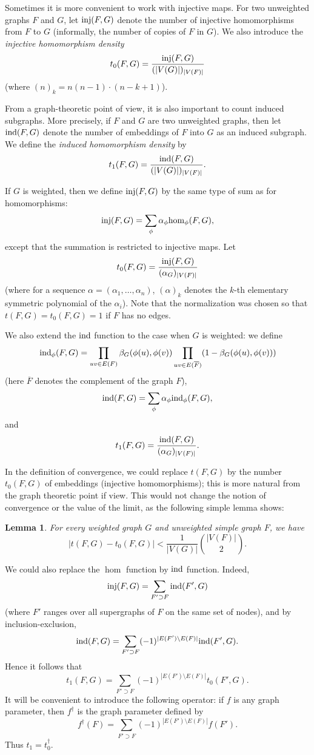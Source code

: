 \documentclass[fleqn]{article}
\newtheorem{lemma}[theorem]{Lemma}
\begin{document}
Sometimes it is more convenient to work with injective maps. For two
unweighted graphs $F$ and $G$, let ${\rm inj}(F,G)$ denote the number of
injective homomorphisms from $F$ to $G$ (informally, the number of
copies of $F$ in $G$). We also introduce the {\it injective
homomorphism density}
\[
t_0(F,G)=\frac{{\rm inj}(F,G)}{(|V(G)|)_{|V(F)|}}
\]
(where $(n)_k=n(n-1)\cdot(n-k+1)$).

From a graph-theoretic point of view, it is also important to count
induced subgraphs. More precisely, if $F$ and $G$ are two unweighted
graphs, then let ${\rm ind}(F,G)$ denote the number of embeddings of $F$
into $G$ as an induced subgraph. We define the {\it induced
homomorphism density} by
\[
t_1(F,G)=\frac{{\rm ind}(F,G)}{(|V(G)|)_{|V(F)|}}.
\]

If $G$ is weighted, then we define ${\rm inj}(F,G)$ by the same type of
sum as for homomorphisms:
\[
{\rm inj}(F,G)=\sum_{\phi} \alpha_\phi {\rm hom}_\phi(F,G),
\]
except that the summation is restricted to injective maps. Let
\[
t_0(F,G)=\frac{{\rm inj}(F,G)}{(\alpha_G)_{|V(F)|}}
\]
(where for a sequence $\alpha=(\alpha_1,\dots,\alpha_n)$,
$(\alpha)_k$ denotes the $k$-th elementary symmetric polynomial of
the $\alpha_i$). Note that the normalization was chosen so that
$t(F,G)=t_0(F,G)=1$ if $F$ has no edges.

We also extend the ${\rm ind}$ function to the case when $G$ is weighted:
we define
\[
{\rm ind}_{\phi}(F,G)=\prod_{uv\in E(F)} \beta_G(\phi(u),\phi(v))
\prod_{uv\in E(\overline{F})} (1-\beta_G(\phi(u),\phi(v)))
\]
(here $\overline{F}$ denotes the complement of the graph $F$),
\[
{\rm ind}(F,G)=\sum_{\phi} \alpha_\phi {\rm ind}_\phi(F,G),
\]
and
\[
t_1(F,G)=\frac{{\rm ind}(F,G)}{(\alpha_G)_{|V(F)|}}.
\]

In the definition of convergence, we could replace $t(F,G)$ by the
number $t_0(F,G)$ of embeddings (injective homomorphisms); this is
more natural from the graph theoretic point if view. This would not
change the notion of convergence or the value of the limit, as the
following simple lemma shows:

\begin{lemma}\label{HOM-INJ}
For every weighted graph $G$ and unweighted simple graph $F$, we have
\[
|t(F,G) -t_0(F,G)| <\frac{1}{|V(G)|}\binom{|V(F)|}{2}.
\]
\end{lemma}

We could also replace the $\hom$ function by ${\rm ind}$ function. Indeed,
\[
{\rm inj}(F,G)=\sum_{F'\supset F}{\rm ind}(F',G)
\]
(where $F'$ ranges over all supergraphs  of $F$ on the same set of
nodes), and by inclusion-exclusion,
\[
{\rm ind}(F,G)=\sum_{F'\supset F}(-1)^{|E(F')\setminus E(F)|} {\rm ind}(F',G).
\]
Hence it follows that
\[
t_1(F,G)=\sum_{F'\supset F}(-1)^{|E(F')\setminus E(F)|} t_0(F',G).
\]
It will be convenient to introduce the following operator: if $f$ is
any graph parameter, then $f^{\dagger}$ is the graph parameter
defined by
\[
f^{\dagger}(F)=\sum_{F'\supset F}(-1)^{|E(F')\setminus E(F)|} f(F').
\]
Thus $t_1=t_0^\dagger$.
\end{document}
